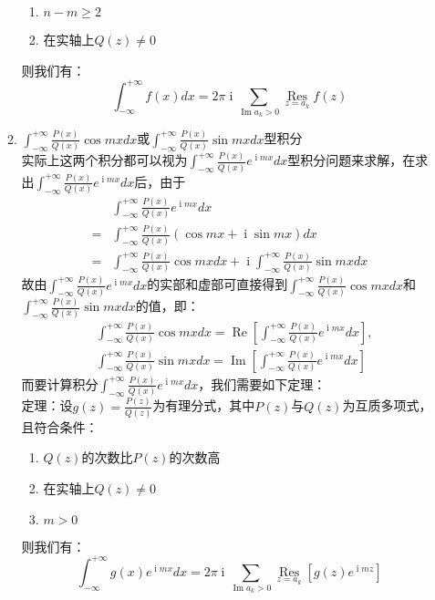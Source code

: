 \documentclass[12pt,a4paper,UTF8]{book}
\begin{document}
\begin{enumerate}
\begin{enumerate}
\begin{enumerate}
\item $n-m\ge2$
\item 在实轴上$Q\left(z\right)\ne0$
\end{enumerate}
则我们有：
\[\int_{-\infty}^{+\infty}f\left(x\right)dx=2\pi\operatorname{i}\sum\limits_{\operatorname{Im}a_k>0}\mathop{\operatorname{Res}}\limits_{z=a_k}f\left(z\right)\]
\item $\int_{-\infty}^{+\infty}\frac{P\left(x\right)}{Q\left(x\right)}\cos mxdx$或$\int_{-\infty}^{+\infty}\frac{P\left(x\right)}{Q\left(x\right)}\sin mxdx$型积分\\
实际上这两个积分都可以视为$\int_{-\infty}^{+\infty}\frac{P\left(x\right)}{Q\left(x\right)}e^{\operatorname{i}mx}dx$型积分问题来求解，在求出$\int_{-\infty}^{+\infty}\frac{P\left(x\right)}{Q\left(x\right)}e^{\operatorname{i}mx}dx$后，由于
\[\begin{aligned}
&\int_{-\infty}^{+\infty}\frac{P\left(x\right)}{Q\left(x\right)}e^{\operatorname{i}mx}dx\\
=&\int_{-\infty}^{+\infty}\frac{P\left(x\right)}{Q\left(x\right)}\left(\cos mx+\operatorname{i}\sin mx\right)dx\\
=&\int_{-\infty}^{+\infty}\frac{P\left(x\right)}{Q\left(x\right)}\cos mxdx+\operatorname{i}\int_{-\infty}^{+\infty}\frac{P\left(x\right)}{Q\left(x\right)}\sin mxdx
\end{aligned}\]
故由$\int_{-\infty}^{+\infty}\frac{P\left(x\right)}{Q\left(x\right)}e^{\operatorname{i}mx}dx$的实部和虚部可直接得到$\int_{-\infty}^{+\infty}\frac{P\left(x\right)}{Q\left(x\right)}\cos mxdx$和$\int_{-\infty}^{+\infty}\frac{P\left(x\right)}{Q\left(x\right)}\sin mxdx$的值，即：
\[\begin{aligned}
&\int_{-\infty}^{+\infty}\frac{P\left(x\right)}{Q\left(x\right)}\cos mxdx=\operatorname{Re}\left[\int_{-\infty}^{+\infty}\frac{P\left(x\right)}{Q\left(x\right)}e^{\operatorname{i}mx}dx\right],\\
&\int_{-\infty}^{+\infty}\frac{P\left(x\right)}{Q\left(x\right)}\sin mxdx=\operatorname{Im}\left[\int_{-\infty}^{+\infty}\frac{P\left(x\right)}{Q\left(x\right)}e^{\operatorname{i}mx}dx\right]
\end{aligned}\]
而要计算积分$\int_{-\infty}^{+\infty}\frac{P\left(x\right)}{Q\left(x\right)}e^{\operatorname{i}mx}dx$，我们需要如下定理：\\
定理：设$g\left(z\right)=\frac{P\left(z\right)}{Q\left(z\right)}$为有理分式，其中$P\left(z\right)$与$Q\left(z\right)$为互质多项式，且符合条件：
\begin{enumerate}
\item $Q\left(z\right)$的次数比$P\left(z\right)$的次数高
\item 在实轴上$Q\left(z\right)\ne0$
\item $m>0$
\end{enumerate}
则我们有：
\[\int_{-\infty}^{+\infty}g\left(x\right)e^{\operatorname{i}mx}dx=2\pi\operatorname{i}\sum\limits_{\operatorname{Im}a_k>0}\mathop{\operatorname{Res}}\limits_{z=a_k}\left[g\left(z\right)e^{\operatorname{i}mz}\right]\]
\end{enumerate}
\end{enumerate}
\end{document}
